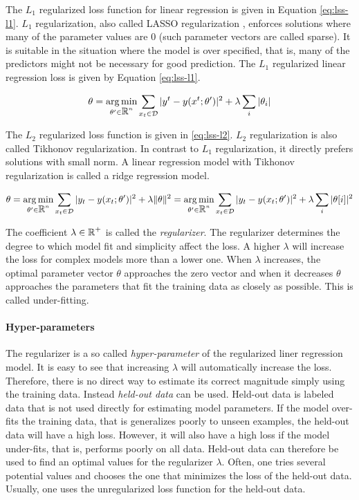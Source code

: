 The $L_1$ regularized loss function for linear regression is given in
Equation \ref{eq:lss-l1}. $L_1$ regularization, also called LASSO
regularization \cite{Tibshirani1996}, enforces solutions where many of
the parameter values are $0$ (such parameter vectors are called
sparse). It is suitable in the situation where the model is over
specified, that is, many of the predictors might not be necessary for
good prediction. The $L_1$ regularized linear regression loss is given
by Equation \ref{eq:lss-l1}.

\begin{equation}
\theta = \operatorname*{arg\,min}_{\theta' \in \mbox{$\mathbb R$}^n} \sum_{x_t \in \mathcal{D}} | y^t - y(x^t\mbox{$ ; \, $} \theta')|^2 + \lambda \sum_i |\theta_i|\label{eq:lss-l1}
\end{equation}

The $L_2$ regularized loss function is given in \ref{eq:lss-l2}. $L_2$
regularization is also called Tikhonov regularization. In contrast to
$L_1$ regularization, it directly prefers solutions with small norm. A
linear regression model with Tikhonov regularization is called a ridge
regression model.

\begin{equation}
\theta = \operatorname*{arg\,min}_{\theta' \in \mbox{$\mathbb R$}^n} \sum_{x_t \in \mathcal{D}} | y_t - y(x_t\mbox{$ ; \, $} \theta')|^2 + \lambda \|\theta\|^2 = \operatorname*{arg\,min}_{\theta' \in \mbox{$\mathbb R$}^n} \sum_{x_t \in \mathcal{D}} | y_t - y(x_t\mbox{$ ; \, $} \theta')|^2 + \lambda \sum_i |\theta[i]|^2\label{eq:lss-l2}
\end{equation}

The coefficient $\lambda \in \mbox{$\mathbb R$}^+$ is called the {\it
  regularizer}. The regularizer determines the degree to which model
fit and simplicity affect the loss. A higher $\lambda$ will increase
the loss for complex models more than a lower one. When $\lambda$
increases, the optimal parameter vector $\theta$ approaches the zero
vector and when it decreases $\theta$ approaches the parameters that
fit the training data as closely as possible. This is called
under-fitting.

\paragraph{Hyper-parameters} The regularizer is a so called {\it
  hyper-parameter} of the regularized liner regression model. It is
easy to see that increasing $\lambda$ will automatically increase the
loss. Therefore, there is no direct way to estimate its correct
magnitude simply using the training data. Instead {\it held-out data}
can be used. Held-out data is labeled data that is not used directly
for estimating model parameters. If the model over-fits the training
data, that is generalizes poorly to unseen examples, the held-out data
will have a high loss. However, it will also have a high loss if the
model under-fits, that is, performs poorly on all data. Held-out data
can therefore be used to find an optimal values for the regularizer
$\lambda$. Often, one tries several potential values and chooses the
one that minimizes the loss of the held-out data. Usually, one uses
the unregularized loss function for the held-out data.

